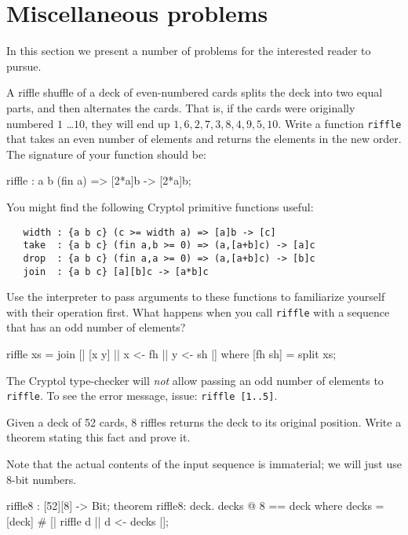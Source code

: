 
\chapter{Miscellaneous problems}


In this section we present a number of problems for the interested
reader to pursue.

\begin{Exercise}\label{ex:misc:riffle}
  A riffle shuffle of a deck of even-numbered cards splits the deck
  into two equal parts, and then alternates the cards. That is, if the
  cards were originally numbered $1$ \ldots $10$, they will end up $1,
  6, 2, 7, 3, 8, 4, 9, 5, 10$. Write a function {\tt riffle} that
  takes an even number of elements and returns the elements in the new
  order. The signature of your function should be:
\begin{code}
   riffle : {a b} (fin a) => [2*a]b -> [2*a]b;
\end{code}
You might find the following Cryptol primitive functions useful:
\begin{Verbatim}
   width : {a b c} (c >= width a) => [a]b -> [c]
   take  : {a b c} (fin a,b >= 0) => (a,[a+b]c) -> [a]c
   drop  : {a b c} (fin a,a >= 0) => (a,[a+b]c) -> [b]c
   join  : {a b c} [a][b]c -> [a*b]c
\end{Verbatim}
Use the interpreter to pass arguments to these functions to
familiarize yourself with their operation first. What happens when you
call {\tt riffle} with a sequence that has an odd number of elements?
\end{Exercise}

\begin{Answer}
\begin{code}
  riffle xs = join [| [x y] || x <- fh || y <- sh |]
    where [fh sh] = split xs;
\end{code}
The Cryptol type-checker will {\em not} allow passing an odd number of
elements to {\tt riffle}. To see the error message, issue: {\tt riffle
  [1..5]}.
\end{Answer}

\begin{Exercise}\label{ex:misc:riffle2}
  Given a deck of 52 cards, 8 riffles returns the deck to its original
  position. Write a theorem stating this fact and prove it.
\end{Exercise}
\begin{Answer}
  Note that the actual contents of the input sequence is immaterial;
  we will just use 8-bit numbers.
\begin{code}
   riffle8 : [52][8] -> Bit;
   theorem riffle8: {deck}. decks @ 8 == deck
     where decks = [deck] # [| riffle d || d <- decks |];
\end{code}
\end{Answer}

